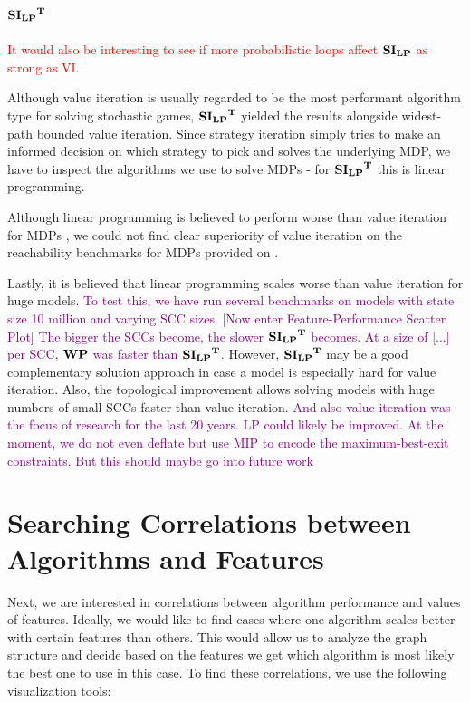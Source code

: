 \subsection{$\mathbf{\mathbf{SI_{LP}}^T}$}
\textcolor{red}{It would also be interesting to see if more probabilistic loops affect $\mathbf{SI_{LP}}$ as strong as VI}.

Although value iteration is usually regarded to be the most performant algorithm type for solving stochastic games, 
$\mathbf{\mathbf{SI_{LP}}^T}$ yielded the results alongside widest-path bounded value iteration.
Since strategy iteration simply tries to make an informed decision on which strategy to pick and solves the underlying MDP, 
we have to inspect the algorithms we use to solve MDPs - for $\mathbf{\mathbf{SI_{LP}}^T}$ this is linear programming.

Although linear programming is believed to perform worse than value iteration for MDPs \cite{ANYTHING?},
we could not find clear superiority of value iteration on the reachability benchmarks for MDPs provided on \cite{QComps}.

Lastly, it is believed that linear programming scales worse than value iteration for huge models. \textcolor{purple}{To test this, we have 
run several benchmarks on models with state size 10 million and varying SCC sizes. [Now enter Feature-Performance Scatter Plot] 
The bigger the SCCs become, the slower $\mathbf{\mathbf{SI_{LP}}^T}$ becomes. At a size of [...] per SCC, $\mathbf{WP}$ was faster than $\mathbf{\mathbf{SI_{LP}}^T}$.}
However, $\mathbf{\mathbf{SI_{LP}}^T}$ may be a good complementary solution approach in case a model is especially hard for value iteration.
Also, the topological improvement allows solving models with huge numbers of small SCCs faster than value iteration.
\textcolor{purple}{And also value iteration was the focus of research for the last 20 years. 
LP could likely be improved. At the moment, we do not even deflate but use MIP to encode the maximum-best-exit constraints. But this should maybe go into future work}


\section{Searching Correlations between Algorithms and Features}
Next, we are interested in correlations between algorithm performance and values of features.
Ideally, we would like to find cases where one algorithm scales better with certain features than others.
This would allow us to analyze the graph structure and decide based on the features we get which algorithm is most likely the best one to use in this case.
To find these correlations, we use the following visualization tools:

